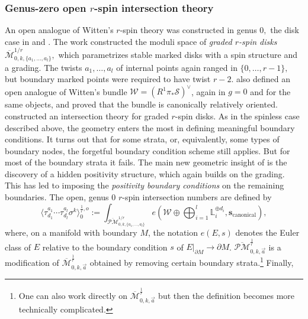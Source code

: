 \documentclass[11pt]{amsart}
\theoremstyle{definition}
\theoremstyle{remark}
\newcommand{\Mbarr}{{{\overline{\mathcal{M}}}^{\frac{1}{r}}_{0,k,\vec{a}}}}
\newcommand{\oPM}{{\overline{\mathcal{PM}}}^{1/r}}
\newcommand{\oPMr}{{{\overline{\mathcal{PM}}}^{\frac{1}{r}}_{0,k,\vec{a}}}}
\newcommand{\<}{\left<}
\renewcommand{\>}{\right>}
\numberwithin{equation}{section}
\def\Mbar{{\overline{\mathcal M}}}
\begin{document}
\subsubsection{Genus-zero open $r$-spin intersection theory}
An open analogue of Witten's $r$-spin theory was constructed in genus $0,$ the disk case in \cite{BCT1,BCT2} and \cite{TZ1,TZ2}.
The work \cite{BCT1} constructed the moduli space of %
\emph{graded $r$-spin disks}~$\Mbar_{0,k,\{a_1, \ldots, a_l\}}^{1/r},$ which %
parametrizes stable marked disks with a spin structure and a grading. The twists $a_1,\ldots,a_l$ of internal points again ranged in $\{0,\ldots,r-1\},$ but boundary marked points were required to have twist $r-2.$ \cite{BCT1} also defined an open analogue of Witten's bundle $\mathcal{W}=(R^1\pi_*\mathcal{S})^{\vee}$, again in $g=0$ and for the same objects, and proved that the bundle is canonically relatively oriented.
\cite{BCT2} constructed an intersection theory for graded $r$-spin disks. As in the spinless case described above, the geometry enters the most in defining meaningful boundary conditions.
It turns out that for some strata, or, equivalently, some types of boundary nodes, the forgetful boundary condition scheme still applies. But for most of the boundary strata it fails. The main new geometric insight of \cite{BCT2} is the discovery of a hidden positivity structure, which again builds on the grading. This has led to imposing the \emph{positivity boundary conditions} on the remaining boundaries. 
The open, genus $0$ $r$-spin intersection numbers are defined by
\begin{equation}
\label{eq:intnums}
\langle\tau_{d_1}^{a_1}\cdots\tau^{a_l}_{d_l}\sigma^k\rangle^{\frac{1}{r},o}_0:=\int_{\oPM_{0,k,\{a_1, \ldots, a_l\}}} e\left( \mathcal{W} \oplus \bigoplus_{i=1}^l \mathbb{L}_i^{\oplus d_i}, \mathbf{s}_{\text{canonical}}\right),
\end{equation}
where, on a manifold with boundary $M$, the notation $e(E,s)$ denotes the Euler class of $E$ relative to the boundary condition $s$ of $E|_{\partial M}\to \partial M$. $\oPMr$ is a modification of $\Mbarr$ obtained by removing certain %
boundary strata.\footnote{One can also work directly on $\Mbarr$ but then the definition becomes more technically complicated.} Finally, %
\end{document}
